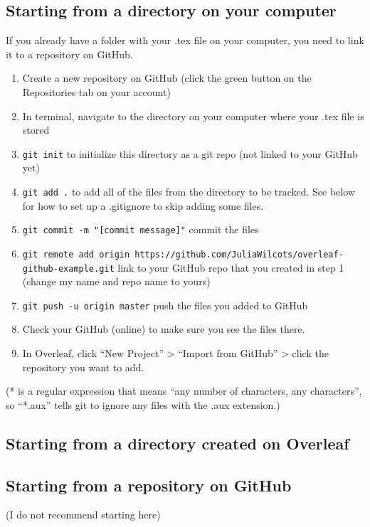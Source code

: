 \documentclass[10pt]{article}
\begin{document}
\subsection{Starting from a directory on your computer}
If you already have a folder with your .tex file on your computer, you need to link it to a repository on GitHub.
\begin{enumerate}
\item Create a new repository on GitHub (click the green button on the Repositories tab on your account)
\item In terminal, navigate to the directory on your computer where your .tex file is stored
\item \texttt{git init} to initialize this directory as a git repo (not linked to your GitHub yet)
\item \texttt{git add .} to add all of the files from the directory to be tracked. See below for how to set up a .gitignore to skip adding some files.
\item \texttt{git commit -m "[commit message]"} commit the files
\item \texttt{git remote add origin https://github.com/JuliaWilcots/overleaf-github-example.git} link to your GitHub repo that you created in step 1 (change my name and repo name to yours)
\item \texttt{git push -u origin master} push the files you added to GitHub
\item Check your GitHub (online) to make sure you see the files there.
\item In Overleaf, click ``New Project'' > ``Import from GitHub''  > click the repository you want to add.
\end{enumerate}
(* is a regular expression that means ``any number of characters, any characters'', so ``*.aux'' tells git to ignore any files with the .aux extension.)

\subsection{Starting from a directory created on Overleaf}

\subsection{Starting from a repository on GitHub}
(I do not recommend starting here)
\end{document}
